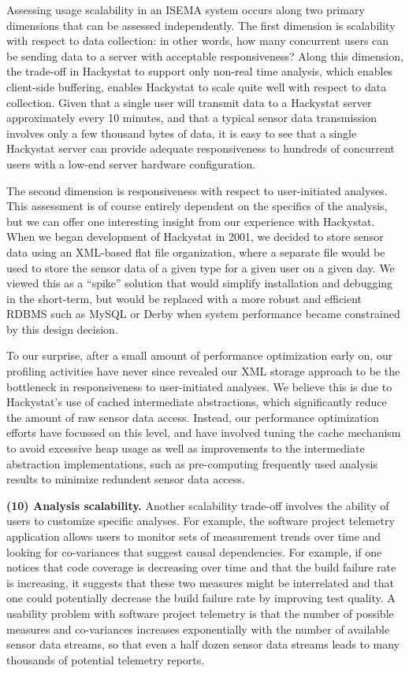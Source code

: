 \documentclass[10pt,twocolumn]{article}
\begin{document}
Assessing usage scalability in an ISEMA system occurs along two primary
dimensions that can be assessed independently.  The first dimension is
scalability with respect to data collection: in other words, how many
concurrent users can be sending data to a server with acceptable
responsiveness?  Along this dimension, the trade-off in Hackystat to
support only non-real time analysis, which enables client-side buffering,
enables Hackystat to scale quite well with respect to data
collection. Given that a single user will transmit data to a Hackystat
server approximately every 10 minutes, and that a typical sensor data
transmission involves only a few thousand bytes of data, it is easy to see
that a single Hackystat server can provide adequate responsiveness to
hundreds of concurrent users with a low-end server hardware configuration.

The second dimension is responsiveness with respect to user-initiated
analyses.  This assessment is of course entirely dependent on the specifics
of the analysis, but we can offer one interesting insight from our
experience with Hackystat. When we began development of Hackystat in 2001,
we decided to store sensor data using an XML-based flat file organization,
where a separate file would be used to store the sensor data of a given
type for a given user on a given day. We viewed this as a ``spike''
solution that would simplify installation and debugging in the short-term,
but would be replaced with a more robust and efficient RDBMS such as MySQL
or Derby when system performance became constrained by this design
decision.

To our surprise, after a small amount of performance optimization early on,
our profiling activities have never since revealed our XML storage approach
to be the bottleneck in responsiveness to user-initiated analyses.  We
believe this is due to Hackystat's use of cached intermediate abstractions,
which significantly reduce the amount of raw sensor data access.  Instead,
our performance optimization efforts have focussed on this level, and have
involved tuning the cache mechanism to avoid excessive heap usage as well
as improvements to the intermediate abstraction implementations, such as
pre-computing frequently used analysis results to minimize redundent sensor
data access.


{\bf (10) Analysis scalability.} Another scalability trade-off involves the
ability of users to customize specific analyses.  For example, the software
project telemetry application allows users to monitor sets of
measurement trends over time and looking for co-variances that suggest
causal dependencies.  For example, if one notices that code coverage is
decreasing over time and that the build failure rate is increasing, it
suggests that these two measures might be interrelated and that one could
potentially decrease the build failure rate by improving test quality.  A
usability problem with software project telemetry is that the number of
possible measures and co-variances increases exponentially with the number
of available sensor data streams, so that even a half dozen sensor data
streams leads to many thousands of potential telemetry reports.
\end{document}
